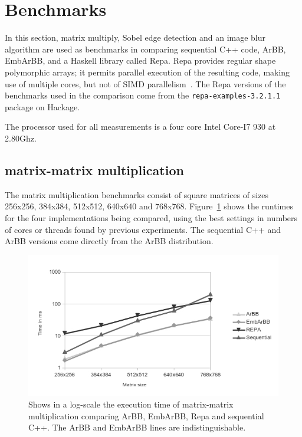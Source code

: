 \section{Benchmarks}
\label{sec:Benchmarks}

In this section, matrix multiply, Sobel edge detection and an image blur
algorithm are used as benchmarks in comparing sequential C++ code, ArBB, EmbArBB, 
and a Haskell library called Repa. 
Repa provides regular shape polymorphic arrays; it permits
parallel execution of the resulting code, making use of multiple
cores, but not of SIMD parallelism~\cite{REPA}.
The Repa versions of the benchmarks used in the comparison 
come from the {\tt repa-examples-3.2.1.1} package on Hackage. 

The processor used for all measurements is a four core Intel Core-I7 930 at 
2.80Ghz. 

\subsection{matrix-matrix multiplication}
The matrix multiplication benchmarks consist of square matrices 
of sizes 256x256, 384x384, 512x512, 640x640 and 768x768. 
Figure~\ref{fig:mmchart1} shows the runtimes for the four implementations 
being compared, using the best settings in numbers of cores or threads found 
by previous experiments. The sequential C++ and ArBB versions come 
directly from the ArBB distribution.

\begin{figure}
\includegraphics[width=\linewidth]{./embarbb/img/mmchart1}
\caption{Shows in a log-scale the execution time of matrix-matrix multiplication
         comparing ArBB, EmbArBB, Repa and sequential C++. The ArBB and 
         EmbArBB lines are indistinguishable.}
\label{fig:mmchart1}
\end{figure}

